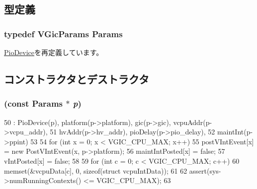 \subsection{型定義}
\hypertarget{classVGic_aba305d5be632386ad18939cafec46fee}{
\subsubsection[{Params}]{\setlength{\rightskip}{0pt plus 5cm}typedef VGicParams {\bf Params}}}
\label{classVGic_aba305d5be632386ad18939cafec46fee}


\hyperlink{classPioDevice_a9cdbda5b5cc24147ce82b7d07bf03cd1}{PioDevice}を再定義しています。

\subsection{コンストラクタとデストラクタ}
\hypertarget{classVGic_a8c1d925f2ffb272c08d5a830d171877e}{
\subsubsection[{VGic}]{ (const {\bf Params} $\ast$ {\em p})}}
\label{classVGic_a8c1d925f2ffb272c08d5a830d171877e}



\begin{DoxyCode}
50     : PioDevice(p), platform(p->platform), gic(p->gic), vcpuAddr(p->vcpu_addr),
51       hvAddr(p->hv_addr), pioDelay(p->pio_delay),
52       maintInt(p->ppint)
53 {
54     for (int x = 0; x < VGIC_CPU_MAX; x++) {
55         postVIntEvent[x] = new PostVIntEvent(x, p->platform);
56         maintIntPosted[x] = false;
57         vIntPosted[x] = false;
58     }
59     for (int c = 0; c < VGIC_CPU_MAX; c++) {
60         memset(&vcpuData[c], 0, sizeof(struct vcpuIntData));
61     }
62     assert(sys->numRunningContexts() <= VGIC_CPU_MAX);
63 }
\end{DoxyCode}


